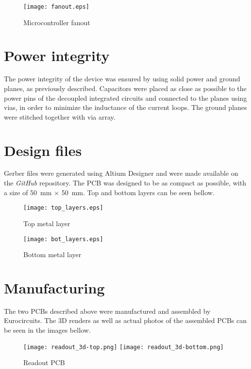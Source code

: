 \FloatBarrier
\begin{figure}[htp!]
    \centering
    \texttt{[image: fanout.eps]}
    \caption{Microcontroller fanout}
    \label{fig:fanout}
\end{figure}
\FloatBarrier

\section{Power integrity}
The power integrity of the device was ensured by using solid power and ground planes, as previously described. Capacitors were placed as close as possible to the power pins of the decoupled integrated circuits and connected to the planes using vias, in order to minimize the inductance of the current loops. The ground planes were stitched together with via array.

\section{Design files}
Gerber files were generated using Altium Designer and were made available on the \emph{GitHub} repository. \cite{wojtacz_fastic_readout_hw} The PCB was designed to be as compact as possible, with a size of \SI{50}{\milli\meter} $\times$ \SI{50}{\milli\meter}. Top and bottom layers can be seen bellow.

\FloatBarrier
\begin{figure}[htp!]
    \centering
    \texttt{[image: top\_layers.eps]}
    \caption{Top metal layer}
    \label{fig:metal_top}
\end{figure}
\FloatBarrier

\FloatBarrier
\begin{figure}[htp!]
    \centering
    \texttt{[image: bot\_layers.eps]}
    \caption{Bottom metal layer}
    \label{fig:metal_bot}
\end{figure}
\FloatBarrier

\section{Manufacturing}
The two PCBs described above were manufactured and assembled by Eurocircuits. The 3D renders as well as actual photos of the assembled PCBs can be seen in the images bellow. 



\FloatBarrier
\begin{figure}[htp!]
    \centering
    \texttt{[image: readout\_3d-top.png]}
    \texttt{[image: readout\_3d-bottom.png]}
    \caption{Readout PCB}
    \label{fig:readout_3d}
\end{figure}
\FloatBarrier

